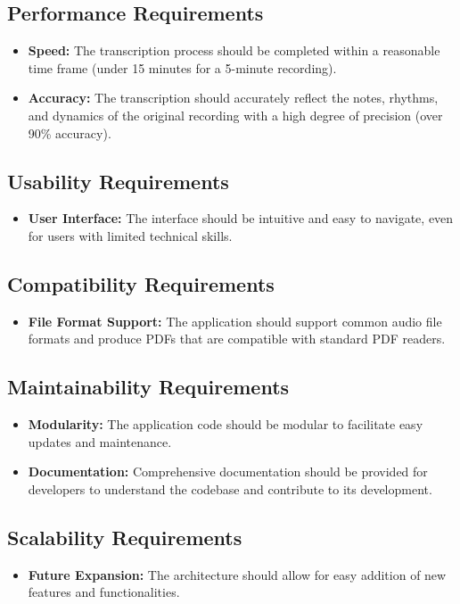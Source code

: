 \documentclass{article}
\begin{document}
\subsection{Performance Requirements}
\begin{itemize}
    \item \textbf{Speed:} The transcription process should be completed within a reasonable time frame (under 15 minutes for a 5-minute recording).
    \item \textbf{Accuracy:} The transcription should accurately reflect the notes, rhythms, and dynamics of the original recording with a high degree of precision (over 90\% accuracy).
\end{itemize}

\subsection{Usability Requirements}
\begin{itemize}
    \item \textbf{User Interface:} The interface should be intuitive and easy to navigate, even for users with limited technical skills.
\end{itemize}

\subsection{Compatibility Requirements}
\begin{itemize}
    \item \textbf{File Format Support:} The application should support common audio file formats and produce PDFs that are compatible with standard PDF readers.
\end{itemize}

\subsection{Maintainability Requirements}
\begin{itemize}
    \item \textbf{Modularity:} The application code should be modular to facilitate easy updates and maintenance.
    \item \textbf{Documentation:} Comprehensive documentation should be provided for developers to understand the codebase and contribute to its development.
\end{itemize}

\subsection{Scalability Requirements}
\begin{itemize}
    \item \textbf{Future Expansion:} The architecture should allow for easy addition of new features and functionalities.
\end{itemize}
\end{document}
